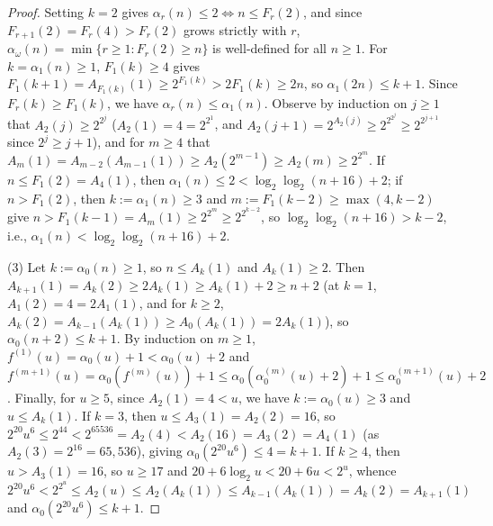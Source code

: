 \documentclass[11pt]{article}
\theoremstyle{definition}
\theoremstyle{remark}
\begin{document}
\begin{proof}
Setting $k = 2$ gives $\alpha_r(n) \le 2 \iff n \le F_r(2)$, and since $F_{r+1}(2) = F_r(4) > F_r(2)$ grows strictly with $r$, $\alpha_\omega(n) = \min\{r \ge 1 : F_r(2) \ge n\}$ is well-defined for all $n \ge 1$. For $k = \alpha_1(n) \ge 1$, $F_1(k) \ge 4$ gives $F_1(k + 1) = A_{F_1(k)}(1) \ge 2^{F_1(k)} > 2 F_1(k) \ge 2n$, so $\alpha_1(2n) \le k + 1$. Since $F_r(k) \ge F_1(k)$, we have $\alpha_r(n) \le \alpha_1(n)$. Observe by induction on $j \ge 1$ that $A_2(j) \ge 2^{2^j}$ ($A_2(1) = 4 = 2^{2^1}$, and $A_2(j + 1) = 2^{A_2(j)} \ge 2^{2^{2^j}} \ge 2^{2^{j+1}}$ since $2^j \ge j + 1$), and for $m \ge 4$ that $A_m(1) = A_{m-2}(A_{m-1}(1)) \ge A_2(2^{m-1}) \ge A_2(m) \ge 2^{2^m}$. If $n \le F_1(2) = A_4(1)$, then $\alpha_1(n) \le 2 < \log_2\log_2(n + 16) + 2$; if $n > F_1(2)$, then $k := \alpha_1(n) \ge 3$ and $m := F_1(k - 2) \ge \max(4, k - 2)$ give $n > F_1(k - 1) = A_m(1) \ge 2^{2^m} \ge 2^{2^{k-2}}$, so $\log_2\log_2(n + 16) > k - 2$, i.e., $\alpha_1(n) < \log_2\log_2(n + 16) + 2$.

(3) Let $k := \alpha_0(n) \ge 1$, so $n \le A_k(1)$ and $A_k(1) \ge 2$. Then $A_{k+1}(1) = A_k(2) \ge 2 A_k(1) \ge A_k(1) + 2 \ge n + 2$ (at $k = 1$, $A_1(2) = 4 = 2 A_1(1)$, and for $k \ge 2$, $A_k(2) = A_{k-1}(A_k(1)) \ge A_0(A_k(1)) = 2 A_k(1)$), so $\alpha_0(n + 2) \le k + 1$. By induction on $m \ge 1$, $f^{(1)}(u) = \alpha_0(u) + 1 < \alpha_0(u) + 2$ and $f^{(m+1)}(u) = \alpha_0(f^{(m)}(u)) + 1 \le \alpha_0(\alpha_0^{(m)}(u) + 2) + 1 \le \alpha_0^{(m+1)}(u) + 2$. Finally, for $u \ge 5$, since $A_2(1) = 4 < u$, we have $k := \alpha_0(u) \ge 3$ and $u \le A_k(1)$. If $k = 3$, then $u \le A_3(1) = A_2(2) = 16$, so $2^{20} u^6 \le 2^{44} < 2^{65536} = A_2(4) < A_2(16) = A_3(2) = A_4(1)$ (as $A_2(3) = 2^{16} = 65{,}536$), giving $\alpha_0(2^{20} u^6) \le 4 = k + 1$. If $k \ge 4$, then $u > A_3(1) = 16$, so $u \ge 17$ and $20 + 6\log_2 u < 20 + 6u < 2^u$, whence $2^{20} u^6 < 2^{2^u} \le A_2(u) \le A_2(A_k(1)) \le A_{k-1}(A_k(1)) = A_k(2) = A_{k+1}(1)$ and $\alpha_0(2^{20} u^6) \le k + 1$.
\end{proof}
\end{document}
